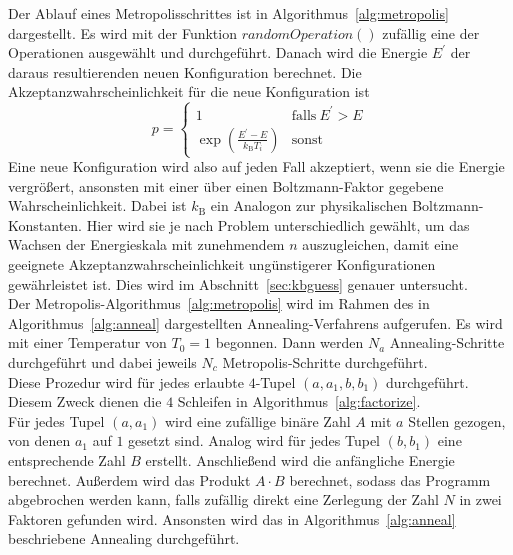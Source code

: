 

Der Ablauf eines Metropolisschrittes ist in Algorithmus~\ref{alg:metropolis} dargestellt. Es wird mit der Funktion $\mathrm{\textit{randomOperation}}\left(\right)$ zufällig eine der Operationen ausgewählt und durchgeführt. Danach wird die Energie $E^\prime$ der daraus resultierenden neuen Konfiguration berechnet. Die Akzeptanzwahrscheinlichkeit für die neue Konfiguration ist
\begin{equation}
		p=\begin{cases}
				1 & \mathrm{falls}\: E^\prime > E \\
				\exp\left(\frac{E^\prime-E}{k_\mathrm{B} T_i}\right) & \mathrm{sonst}
		\end{cases}\label{eq:accept}
\end{equation}
Eine neue Konfiguration wird also auf jeden Fall akzeptiert, wenn sie die Energie vergrößert, ansonsten mit einer über einen Boltzmann-Faktor gegebene Wahrscheinlichkeit. Dabei ist $k_\mathrm{B}$ ein Analogon zur physikalischen Boltzmann-Konstanten. Hier wird sie je nach Problem unterschiedlich gewählt, um das Wachsen der Energieskala mit zunehmendem $n$ auszugleichen, damit eine geeignete Akzeptanzwahrscheinlichkeit ungünstigerer Konfigurationen gewährleistet ist. Dies wird im Abschnitt~\ref{sec:kbguess} genauer untersucht. \\



Der Metropolis-Algorithmus~\ref{alg:metropolis} wird im Rahmen des in Algorithmus~\ref{alg:anneal} dargestellten Annealing-Verfahrens aufgerufen. Es wird mit einer Temperatur von $T_0=1$ begonnen. Dann werden $N_a$ Annealing-Schritte durchgeführt und dabei jeweils $N_c$ Metropolis-Schritte durchgeführt. \\
Diese Prozedur wird für jedes erlaubte $4$-Tupel $\left(a,a_1,b,b_1\right)$ durchgeführt. Diesem Zweck dienen die $4$ Schleifen in Algorithmus~\ref{alg:factorize}. \\
Für jedes Tupel $\left(a,a_1\right)$ wird eine zufällige binäre Zahl $A$ mit $a$ Stellen gezogen, von denen $a_1$ auf $1$ gesetzt sind. Analog wird für jedes Tupel $\left(b,b_1\right)$ eine entsprechende Zahl $B$ erstellt. Anschließend wird die anfängliche Energie berechnet. Außerdem wird das Produkt $A\cdot B$ berechnet, sodass das Programm abgebrochen werden kann, falls zufällig direkt eine Zerlegung der Zahl $N$ in zwei Faktoren gefunden wird. Ansonsten wird das in Algorithmus~\ref{alg:anneal} beschriebene Annealing durchgeführt.

